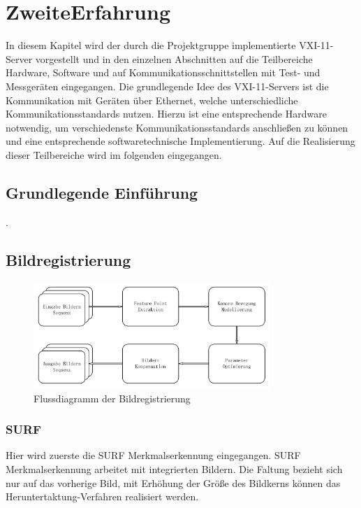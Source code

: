 \chapter{ZweiteErfahrung} \label{cha:ZweiteErfahrung}

In diesem Kapitel wird der durch die Projektgruppe implementierte VXI-11-Server vorgestellt und in den einzelnen Abschnitten auf die Teilbereiche Hardware, Software und auf Kommunikationsschnittstellen mit Test- und Messgeräten eingegangen. Die grundlegende Idee des VXI-11-Servers ist die Kommunikation mit Geräten über Ethernet, welche unterschiedliche Kommunikationsstandards nutzen. Hierzu ist eine entsprechende Hardware notwendig, um verschiedenste Kommunikationsstandards anschließen zu können und eine entsprechende softwaretechnische Implementierung. Auf die Realisierung dieser Teilbereiche wird im folgenden eingegangen.

\section{Grundlegende Einführung} 
\cite{lin1973}.

\section{Bildregistrierung} 

\begin{figure}[htb]
 \centering 
 \includegraphics[keepaspectratio,width=0.8\textwidth]{images/0_Image_Registration_Flussdiagramm.pdf}
 \caption{Flussdiagramm der Bildregistrierung}
 \label{fig:Bildregistrierung}
\end{figure}

\subsection{SURF}
Hier wird zuerste die SURF\cite{Surf} Merkmalserkennung eingegangen. SURF Merkmalserkennung arbeitet mit integrierten Bildern. Die Faltung bezieht sich nur auf das vorherige Bild, mit Erhöhung der Größe des Bildkerns können das Heruntertaktung-Verfahren realisiert werden. 


